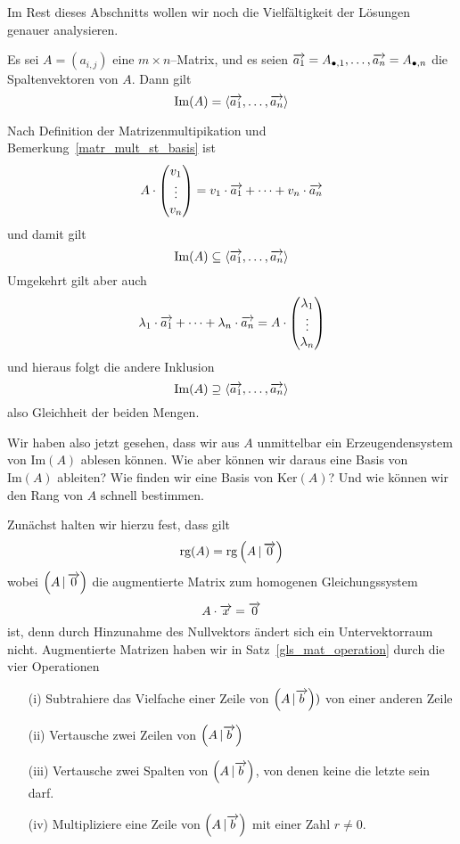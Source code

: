 \bigbreak

Im Rest dieses Abschnitts wollen wir noch die Vielfältigkeit der Lösungen 
genauer analysieren.   

\begin{satz}\label{gls_image_row} Es sei $A = \left( a_{i,j} \right)$ eine $m \times n$--Matrix, und es 
seien $\overrightarrow{a_1} = A_{\bullet,1}, \ldots,  
\overrightarrow{a_n} = A_{\bullet, n}$ die Spaltenvektoren von $A$. Dann gilt
  	$$ \textrm{Im}(A) = \langle \overrightarrow{a_1}, \ldots , 
  	\overrightarrow{a_n} \rangle  $$
\end{satz}  

\beweis Nach Definition der Matrizenmultipikation und 
Bemerkung~\ref{matr_mult_st_basis} ist
  	$$ A \cdot \left( \begin{matrix} v_1 \\ \vdots \\ v_n \end{matrix} \right) = 
 	v_1 \cdot \overrightarrow{a_1} + \cdots + v_n \cdot 
  	\overrightarrow{a_n}  $$
und damit gilt 
  	$$ \textrm{Im}(A) \subseteq \langle \overrightarrow{a_1}, \ldots , 
   	\overrightarrow{a_n} \rangle   $$
Umgekehrt gilt aber auch 
  	$$ \lambda_1 \cdot \overrightarrow{a_1} + \cdots + \lambda_n \cdot 
   	\overrightarrow{a_n} = 
  	A \cdot \left( \begin{matrix} \lambda_1 \\ \vdots \\ \lambda_n \end{matrix} \right)$$
und hieraus folgt die andere Inklusion 
  	$$ \textrm{Im}(A) \supseteq \langle \overrightarrow{a_1}, \ldots , 
   	\overrightarrow{a_n} \rangle   $$
also Gleichheit der beiden Mengen.

\medbreak

Wir haben also jetzt gesehen, dass wir aus $A$ unmittelbar ein Erzeugendensystem von 
$\textrm{Im}(A)$ ablesen können. Wie aber können wir daraus eine Basis von 
$\textrm{Im}(A)$ ableiten? Wie finden wir eine Basis von $\textrm{Ker}(A)$? Und wie 
können wir den Rang von $A$ schnell bestimmen. 

Zunächst halten wir hierzu fest, dass gilt
  	$$ \textrm{rg}(A) = \textrm{rg}\left(A \, \vert \, \overrightarrow{0}\right) $$ 
wobei $\left(A \, \vert \, \overrightarrow{0}\right)$ die augmentierte Matrix zum 
homogenen Gleichungssystem 
  	$$ A \cdot \overrightarrow{x} = \overrightarrow{0} $$
ist, denn durch Hinzunahme des Nullvektors ändert sich ein Untervektorraum nicht.
Augmentierte Matrizen haben wir in Satz~\ref{gls_mat_operation} durch die vier 
Operationen

\begin{itemize}
\item[(i)] Subtrahiere das Vielfache einer Zeile von $\left(A \, \vert \overrightarrow{b}\right))$ 
von einer anderen Zeile 
\item[(ii)] Vertausche zwei Zeilen von $\left(A \, \vert \overrightarrow{b}\right)$ 
\item[(iii)] Vertausche zwei Spalten von $\left(A \, \vert \overrightarrow{b}\right)$, 
von denen keine die letzte sein darf.
\item[(iv)] Multipliziere eine Zeile von $\left(A \, \vert \overrightarrow{b}\right)$ mit einer Zahl 
$r \neq 0$.
\end{itemize}

